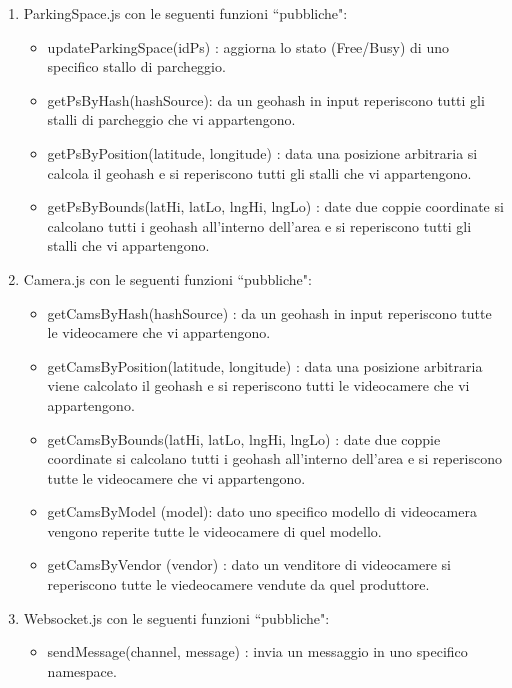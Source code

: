 \begin{enumerate}
	\item ParkingSpace.js con le seguenti funzioni ``pubbliche":
	\begin{itemize}
			\item updateParkingSpace(idPs) : aggiorna lo stato (Free/Busy) di uno specifico stallo di parcheggio.
			\item getPsByHash(hashSource): da un geohash in input reperiscono tutti gli stalli di parcheggio che vi appartengono.
			\item getPsByPosition(latitude, longitude) : data una posizione arbitraria si calcola il geohash e si reperiscono tutti gli stalli che vi appartengono.
			\item getPsByBounds(latHi, latLo, lngHi, lngLo) : date due coppie coordinate si calcolano tutti i geohash all'interno dell'area e si reperiscono tutti gli stalli che vi appartengono.
		\end{itemize}

	\item Camera.js con le seguenti funzioni ``pubbliche":
	\begin{itemize}
			\item getCamsByHash(hashSource) : da un geohash in input reperiscono tutte le videocamere che vi appartengono.
			\item getCamsByPosition(latitude, longitude) : data una posizione arbitraria viene calcolato il geohash e si reperiscono tutti le videocamere che vi appartengono.
			\item getCamsByBounds(latHi, latLo, lngHi, lngLo) : date due coppie coordinate si calcolano tutti i geohash all'interno dell'area e si reperiscono tutte le videocamere che vi appartengono.
			\item getCamsByModel (model): dato uno specifico modello di videocamera vengono reperite tutte le videocamere di quel modello.
			\item getCamsByVendor (vendor) : dato un venditore di videocamere si reperiscono tutte le viedeocamere vendute da quel produttore.
	\end{itemize}

	\item Websocket.js con le seguenti funzioni ``pubbliche":
	\begin{itemize}
		\item sendMessage(channel, message) : invia un messaggio in uno specifico namespace.
	\end{itemize}
\end{enumerate}

